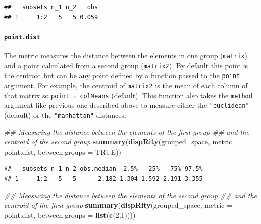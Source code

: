 \documentclass[
]{book}
\newenvironment{Shaded}{\begin{snugshade}}{\end{snugshade}}
\newcommand{\CommentTok}[1]{\textcolor[rgb]{0.56,0.35,0.01}{\textit{#1}}}
\newcommand{\DataTypeTok}[1]{\textcolor[rgb]{0.13,0.29,0.53}{#1}}
\newcommand{\DecValTok}[1]{\textcolor[rgb]{0.00,0.00,0.81}{#1}}
\newcommand{\KeywordTok}[1]{\textcolor[rgb]{0.13,0.29,0.53}{\textbf{#1}}}
\newcommand{\NormalTok}[1]{#1}
\newcommand{\OtherTok}[1]{\textcolor[rgb]{0.56,0.35,0.01}{#1}}
\begin{document}
\begin{verbatim}
##   subsets n_1 n_2   obs
## 1     1:2   5   5 0.059
\end{verbatim}

\hypertarget{point.dist}{%
\paragraph{\texorpdfstring{\texttt{point.dist}}{point.dist}}\label{point.dist}}

The metric measures the distance between the elements in one group (\texttt{matrix}) and a point calculated from a second group (\texttt{matrix2}).
By default this point is the centroid but can be any point defined by a function passed to the \texttt{point} argument.
For example, the centroid of \texttt{matrix2} is the mean of each column of that matrix so \texttt{point\ =\ colMeans} (default).
This function also takes the \texttt{method} argument like previous one described above to measure either the \texttt{"euclidean"} (default) or the \texttt{"manhattan"} distances:

\begin{Shaded}
\begin{Highlighting}[]
\CommentTok{\#\# Measuring the distance between the elements of the first group}
\CommentTok{\#\# and the centroid of the second group}
\KeywordTok{summary}\NormalTok{(}\KeywordTok{dispRity}\NormalTok{(grouped\_space, }\DataTypeTok{metric =}\NormalTok{ point.dist,}
                 \DataTypeTok{between.groups =} \OtherTok{TRUE}\NormalTok{))}
\end{Highlighting}
\end{Shaded}

\begin{verbatim}
##   subsets n_1 n_2 obs.median  2.5%   25%   75% 97.5%
## 1     1:2   5   5      2.182 1.304 1.592 2.191 3.355
\end{verbatim}

\begin{Shaded}
\begin{Highlighting}[]
\CommentTok{\#\# Measuring the distance between the elements of the second group}
\CommentTok{\#\# and the centroid of the first group}
\KeywordTok{summary}\NormalTok{(}\KeywordTok{dispRity}\NormalTok{(grouped\_space, }\DataTypeTok{metric =}\NormalTok{ point.dist,}
                 \DataTypeTok{between.groups =} \KeywordTok{list}\NormalTok{(}\KeywordTok{c}\NormalTok{(}\DecValTok{2}\NormalTok{,}\DecValTok{1}\NormalTok{))))}
\end{Highlighting}
\end{Shaded}
\end{document}
